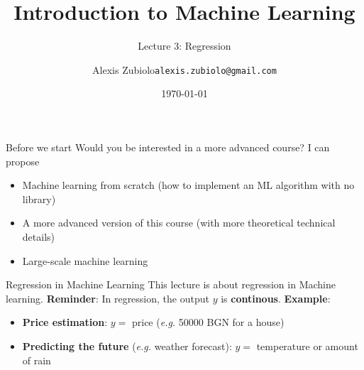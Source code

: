 \documentclass{beamer}
\title[Classification]{Introduction to Machine Learning}
\subtitle{Lecture 3: Regression}
\author{Alexis Zubiolo\newline\texttt{alexis.zubiolo@gmail.com}}
\institute{Data Science Team Lead @ Adcash}
\date{\today}
\begin{document}
\begin{frame}
  \titlepage
\end{frame}

\begin{frame}{Before we start}
Would you be interested in a more advanced course? I can propose 
\begin{itemize}
	\item Machine learning from scratch (how to implement an ML algorithm with no library)
	\item A more advanced version of this course (with more theoretical technical details)
	\item Large-scale machine learning
\end{itemize}
\end{frame}

\begin{frame}{Regression in Machine Learning}
This lecture is about regression in Machine learning.
\vfill
\textbf{Reminder}: In regression, the output $y$ is \textbf{continous}.
\vfill
\textbf{Example}:
\begin{itemize}
	\item \textbf{Price estimation}: $y =$ price (\textit{e.g.} 50000 BGN for a house)
	\item \textbf{Predicting the future} (\textit{e.g.} weather forecast): $y =$ temperature or amount of rain 
\end{itemize}
\end{frame}
\end{document}
